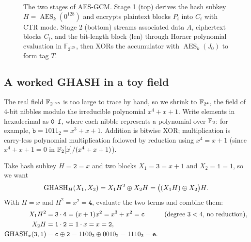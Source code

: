 \begin{figure}[htbp]
\caption{The two stages of AES-GCM. Stage 1 (top) derives the hash subkey $H = \operatorname{AES}_k(0^{128})$ and encrypts plaintext blocks $P_i$ into $C_i$ with CTR mode. Stage 2 (bottom) streams associated data $A$, ciphertext blocks $C_i$, and the bit-length block $\langle\text{len}\rangle$ through Horner polynomial evaluation in $\mathbb{F}_{2^{128}}$, then XORs the accumulator with $\operatorname{AES}_k(J_0)$ to form tag $T$.}
\label{ch16:gcm-fig}
\end{figure}

\subsection{A worked GHASH in a toy field}
\label{ch16:gcm-toy}

The real field $\mathbb{F}_{2^{128}}$ is too large to trace by hand, so we shrink to $\mathbb{F}_{2^4}$, the field of 4-bit nibbles modulo the irreducible polynomial $x^4 + x + 1$. Write elements in hexadecimal as $\texttt{0}$--$\texttt{f}$, where each nibble represents a polynomial over $\mathbb{F}_2$: for example, $\texttt{b} = 1011_2 = x^3 + x + 1$. Addition is bitwise XOR; multiplication is carry-less polynomial multiplication followed by reduction using $x^4 = x + 1$ (since $x^4 + x + 1 = 0$ in $\mathbb{F}_2[x]/(x^4+x+1)$).

Take hash subkey $H = \texttt{2} = x$ and two blocks $X_1 = \texttt{3} = x + 1$ and $X_2 = \texttt{1} = 1$, so we want
\[
\operatorname{GHASH}_H(X_1, X_2) = X_1 H^2 \oplus X_2 H = \bigl((X_1 H) \oplus X_2\bigr)H.
\]
With $H = x$ and $H^2 = x^2 = \texttt{4}$, evaluate the two terms and combine them:
\begin{align*}
X_1 H^2 &= \texttt{3} \cdot \texttt{4} = (x+1)x^2 = x^3 + x^2 = \texttt{c} && \text{(degree $3 < 4$, no reduction)}, \\
X_2 H   &= \texttt{1} \cdot \texttt{2} = 1 \cdot x = x = \texttt{2}, \\
\operatorname{GHASH}_x(\texttt{3},\texttt{1}) &= \texttt{c} \oplus \texttt{2} = 1100_2 \oplus 0010_2 = 1110_2 = \texttt{e}.
\end{align*}

